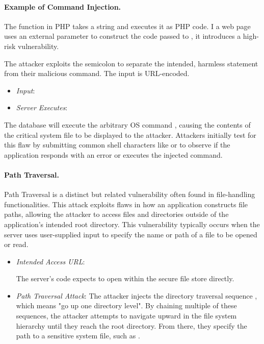 \paragraph{Example of Command Injection.} The  function in PHP takes a string and executes it as PHP code. I a web page uses an external parameter to construct the code passed to , it introduces a high-risk vulnerability.


The attacker exploits the semicolon to separate the intended, harmless statement from their malicious command. The input is URL-encoded.

\begin{itemize}
    \item \textit{Input}: 
    \item \textit{Server Executes}: 
\end{itemize}

The database will execute the arbitrary OS command , causing the contents of the critical system file to be displayed to the attacker. Attackers initially test for this flaw by submitting common shell characters like \NewTexttt{;} or \NewTexttt{\&} to observe if the application responds with an error or executes the injected command.

\paragraph{Path Traversal.} Path Traversal is a distinct but related vulnerability often found in file-handling functionalities. This attack exploits flaws in how an application constructs file paths, allowing the attacker to access files and directories outside of the application's intended root directory. This vulnerability typically occurs when the server uses user-supplied input to specify the name or path of a file to be opened or read.

\begin{itemize}
    \item \textit{Intended Access URL}: 

          The server's code expects to open  within the secure file store directly.
    \item \textit{Path Traversal Attack}: The attacker injects the directory traversal sequence , which means "go up one directory level". By chaining multiple of these sequences, the attacker attempts to navigate upward in the file system hierarchy until they reach the root directory. From there, they specify the path to a sensitive system file, such as .
\end{itemize}

